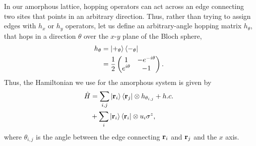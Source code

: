 In our amorphous lattice, hopping operators can act across an edge connecting two sites that points in an arbitrary direction. Thus, rather than trying to assign edges with $h_x$ or $h_y$ operators, let us define an arbitrary-angle hopping matrix $h_{\theta}$, that hops in a direction $\theta$ over the $x$-$y$ plane of the Bloch sphere,
\begin{align}
    h_\theta &= \ket{+_\theta}\bra{-_\theta} \\
    &= \frac 12 \begin{pmatrix}
1 & -e^{-i\theta}\\ 
 e^{i\theta}& -1
\end{pmatrix}.
\end{align}
Thus, the Hamiltonian we use for the amorphous system is given by
\begin{align}\label{eqn:amorphous_qwz_hamiltonian}
\begin{aligned}
    \hat H &= \sum_{i,j} \ket{\textbf r_i}\bra{\textbf r_j} \otimes h_{\theta_{i,j}} + h.c. \\
    &+ \sum_{i} \ket{\textbf r_i}\bra{\textbf r_i} \otimes u_i  \sigma^z,
\end{aligned}
\end{align}
where $\theta_{i,j}$ is the angle between the edge connecting $\textbf r_i$ and $\textbf r_j$ and the $x$ axis.


